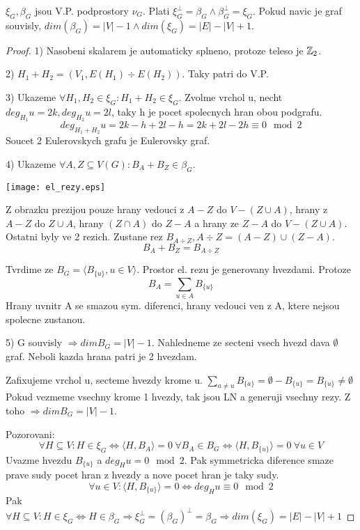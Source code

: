 \begin{theorem}
	$\xi_G, \beta_G$ jsou V.P. podprostory $\nu_G$. Plati $\xi_G^{\perp} = \beta_G \land \beta_G^{\perp} = \xi_G$. Pokud navic je graf souvisly, $dim(\beta_G) = |V| - 1 \land dim(\xi_G) = |E| - |V| + 1$.
\end{theorem}
\begin{proof}
	1) Nasobeni skalarem je automaticky splneno, protoze teleso je $\operatorname{\mathbb{Z}}_2$.

	2) $H_1 + H_2 = (V_1, E(H_1) \div E(H_2))$. Taky patri do V.P.

	3) Ukazeme $\forall H_1, H_2 \in \xi_G: H_1 + H_2 \in \xi_G$. Zvolme vrchol u, necht $deg_{H_1} u = 2k, deg_{H_2} u = 2l$, taky h je pocet spolecnych hran obou podgrafu.
	\[ deg_{H_1 + H_2} u = 2k - h + 2l - h = 2k + 2l - 2h \equiv 0 \mod2 \]
	Soucet 2 Eulerovskych grafu je Eulerovsky graf.

	4) Ukazeme $\forall A,Z \subseteq V(G): B_A + B_Z \in \beta_G$.

	\texttt{[image: el\_rezy.eps]}

	Z obrazku prezijou pouze hrany vedouci z $A - Z$ do $V - (Z\cup A)$, hrany z $A - Z$ do $Z \cup A$, hrany $(Z \cap A)$ do $Z - A$ a hrany ze $Z - A$ do $V - (Z\cup A)$. Ostatni byly ve 2 rezich. Zustane rez $B_{A \div Z}, A \div Z = (A - Z) \cup (Z - A)$.
	\[ B_A + B_Z = B_{A \div Z}\]

	Tvrdime ze $B_G = \langle B_{\{u\}}, u \in V \rangle$. Prostor el. rezu je generovany hvezdami. Protoze
	\[ B_A = \sum_{u \in A} B_{\{u\}} \]
	Hrany uvnitr A se smazou sym. diferenci, hrany vedouci ven z A, ktere nejsou spolecne zustanou.

	5) G souvisly $\Rightarrow dim B_G = |V| - 1$. Nahledneme ze secteni vsech hvezd dava $\emptyset$ graf. Neboli kazda hrana patri je 2 hvezdam.

	Zafixujeme vrchol u, secteme hvezdy krome u. $ \sum_{a \ne u} B_{\{a\}} = \emptyset - B_{\{u\}} = B_{\{u\}} \ne \emptyset $
	Pokud vezmeme vsechny krome 1 hvezdy, tak jsou LN a generuji vsechny rezy. Z toho $\Rightarrow dim B_G = |V| - 1$.

	Pozorovani:
	\[ \forall H \subseteq V: H \in \xi_G \iff \langle H, B_A \rangle = 0 \ \forall B_A \in B_G \iff \langle H, B_{\{u\}} \rangle = 0 \ \forall u \in V \]
	Uvazme hvezdu $B_{\{u\}}$ a $deg_H u = 0 \mod2$. Pak symmetricka diference smaze prave sudy pocet hran z hvezdy a nove pocet hran je taky sudy.
	\[ \forall u \in V: \langle H, B_{\{u\}} \rangle = 0 \iff deg_H u \equiv 0 \mod2 \]
		Pak $ \forall H \subseteq V: H \in \xi_G \iff H \in \beta_G \Rightarrow \xi_G^{\perp} = (\beta_G^{})^{\perp} = \beta_G \Rightarrow dim(\xi_G) = |E| - |V| + 1 $

\end{proof}
